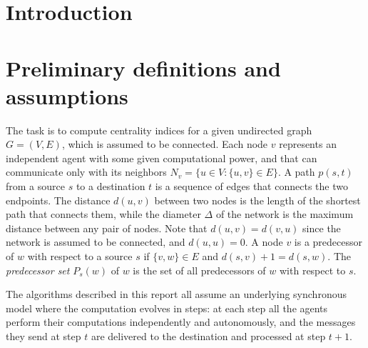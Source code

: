 
\newcommand{\deccen}{\textsc{Deccen}}
\newcommand{\mdisc}{\textsf{{\footnotesize DIS\-COV\-E\-RY}}}
\newcommand{\mdiscargs}[3]{\mdisc$\langle #1,#2,#3, \sigma_{#1 #2} \rangle$}
\newcommand{\mdiscargsfull}[4]{\mdisc$\langle #1,#2,#3, #4 \rangle$}
\newcommand{\mdiscstart}[1]{\mdisc$\langle #1,#1,0,1 \rangle$}
\newcommand{\mrep}{\textsf{{\footnotesize REPORT}}}
\newcommand{\mrepargs}[2]{\mrep$\langle #1,#2, \delta(#1|#2), \sigma(#1|#2), \sigma_{#1 #2} \rangle$}
\newcommand{\mrepleaf}[2]{\mrep$\langle #1,#2, 0, 0, \sigma_{#1 #2} \rangle$}

\newcommand{\swait}[1]{\textsf{{\footnotesize WAITING}}$(#1)$}
\newcommand{\sact}[1]{\textsf{{\footnotesize ACTIVE}}$(#1)$}
\newcommand{\scomp}[1]{\textsf{{\footnotesize COMPLETED}}$(#1)$}


\section{Introduction}

\section{Preliminary definitions and assumptions}

The task is to compute centrality indices for a given undirected graph $G = (V,E)$, which is assumed to be connected. Each node $v$ represents an independent agent with some given computational power, and that can communicate only with its neighbors $N_v = \{u \in V : \{u,v\} \in E\}$. A path $p(s,t)$ from a source $s$ to a destination $t$ is a sequence of edges that connects the two endpoints. The distance $d(u,v)$ between two nodes is the length of the shortest path that connects them, while the diameter $\Delta$ of the network is the maximum distance between any pair of nodes. Note that $d(u,v) = d(v,u)$ since the network is assumed to be connected, and $d(u,u) = 0$. A node $v$ is a predecessor of $w$ with respect to a source $s$ if $\{v,w\} \in E$ and $d(s,v) +1 = d(s,w)$. The \emph{predecessor set} $P_s(w)$ of $w$ is the set of all predecessors of $w$ with respect to $s$.

The algorithms described in this report all assume an underlying synchronous model where the computation evolves in steps: at each step all the agents perform their computations independently and autonomously, and the messages they send at step $t$ are delivered to the destination and processed at step $t+1$.

